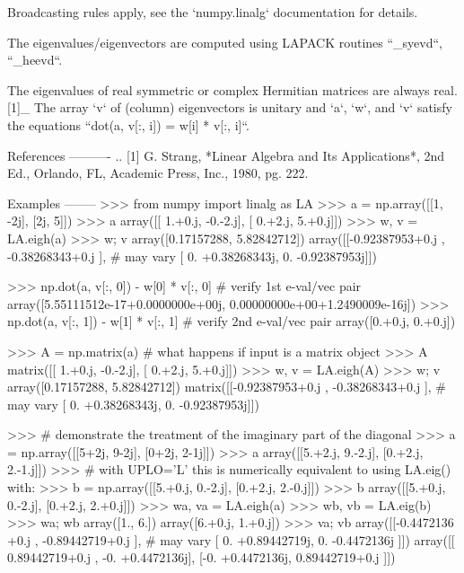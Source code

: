 \begin{DoxyVerb}
Broadcasting rules apply, see the `numpy.linalg` documentation for
details.

The eigenvalues/eigenvectors are computed using LAPACK routines ``_syevd``,
``_heevd``.

The eigenvalues of real symmetric or complex Hermitian matrices are
always real. [1]_ The array `v` of (column) eigenvectors is unitary
and `a`, `w`, and `v` satisfy the equations
``dot(a, v[:, i]) = w[i] * v[:, i]``.

References
----------
.. [1] G. Strang, *Linear Algebra and Its Applications*, 2nd Ed., Orlando,
       FL, Academic Press, Inc., 1980, pg. 222.

Examples
--------
>>> from numpy import linalg as LA
>>> a = np.array([[1, -2j], [2j, 5]])
>>> a
array([[ 1.+0.j, -0.-2.j],
       [ 0.+2.j,  5.+0.j]])
>>> w, v = LA.eigh(a)
>>> w; v
array([0.17157288, 5.82842712])
array([[-0.92387953+0.j        , -0.38268343+0.j        ], # may vary
       [ 0.        +0.38268343j,  0.        -0.92387953j]])

>>> np.dot(a, v[:, 0]) - w[0] * v[:, 0] # verify 1st e-val/vec pair
array([5.55111512e-17+0.0000000e+00j, 0.00000000e+00+1.2490009e-16j])
>>> np.dot(a, v[:, 1]) - w[1] * v[:, 1] # verify 2nd e-val/vec pair
array([0.+0.j, 0.+0.j])

>>> A = np.matrix(a) # what happens if input is a matrix object
>>> A
matrix([[ 1.+0.j, -0.-2.j],
        [ 0.+2.j,  5.+0.j]])
>>> w, v = LA.eigh(A)
>>> w; v
array([0.17157288, 5.82842712])
matrix([[-0.92387953+0.j        , -0.38268343+0.j        ], # may vary
        [ 0.        +0.38268343j,  0.        -0.92387953j]])

>>> # demonstrate the treatment of the imaginary part of the diagonal
>>> a = np.array([[5+2j, 9-2j], [0+2j, 2-1j]])
>>> a
array([[5.+2.j, 9.-2.j],
       [0.+2.j, 2.-1.j]])
>>> # with UPLO='L' this is numerically equivalent to using LA.eig() with:
>>> b = np.array([[5.+0.j, 0.-2.j], [0.+2.j, 2.-0.j]])
>>> b
array([[5.+0.j, 0.-2.j],
       [0.+2.j, 2.+0.j]])
>>> wa, va = LA.eigh(a)
>>> wb, vb = LA.eig(b)
>>> wa; wb
array([1., 6.])
array([6.+0.j, 1.+0.j])
>>> va; vb
array([[-0.4472136 +0.j        , -0.89442719+0.j        ], # may vary
       [ 0.        +0.89442719j,  0.        -0.4472136j ]])
array([[ 0.89442719+0.j       , -0.        +0.4472136j],
       [-0.        +0.4472136j,  0.89442719+0.j       ]])
\end{DoxyVerb}
 \mbox{\label{namespacenumpy_1_1linalg_1_1linalg_a62097a407cd77f9997f960f3f80e6a9f}} 

